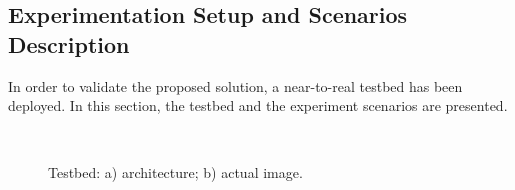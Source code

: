 \subsection{Experimentation Setup and Scenarios Description}
In order to validate the proposed solution, a near-to-real testbed has been deployed. In this section, the testbed and the experiment scenarios are presented.
\begin{figure}[h!]
\centering
{}\,\,\,\,\,\,
\caption[Testbed implementation for the ECVS experimentation.]{Testbed: a) architecture; b) actual image.}
\label{fig:c8_testbed}
\end{figure}

